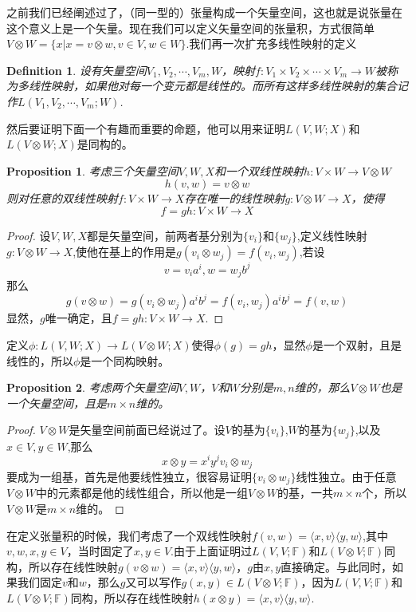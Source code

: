 \documentclass[11pt,a4paper,openany]{book}%
\theoremstyle{plain}%
\newtheorem{pro}{Proposition}[chapter]%
\newtheorem{defi}{Definition}[chapter]%
\begin{document}
之前我们已经阐述过了，（同一型的）张量构成一个矢量空间，这也就是说张量在这个意义上是一个矢量。现在我们可以定义矢量空间的张量积，方式很简单
$V\otimes W=\{x|x=v\otimes w,v\in V,w \in W\}$.我们再一次扩充多线性映射的定义
\begin{defi}
设有矢量空间$V_1,V_2,\cdots,V_m,W$，映射$f:V_1\times V_2\times \cdots \times V_m\rightarrow W$被称为多线性映射，如果他对每一个变元都是线性的。而所有这样多线性映射的集合记作$L(V_1,V_2,\cdots,V_m;W)$.
\end{defi}
然后要证明下面一个有趣而重要的命题，他可以用来证明$L(V,W;X)$和$L(V\otimes W;X)$是同构的。
\begin{pro}
考虑三个矢量空间$V,W,X$和一个双线性映射$h:V\times W\rightarrow V\otimes W$
\[
h(v,w)=v\otimes w
\]
则对任意的双线性映射$f:V\times W\rightarrow X$存在唯一的线性映射$g:V\otimes W\rightarrow X$，使得
\[
f=gh:V\times W\rightarrow X
\]
\end{pro}
\begin{proof}
设$V,W,X$都是矢量空间，前两者基分别为$\{v_i\}$和$\{w_j\}$,定义线性映射$g:V\otimes W\rightarrow X$,使他在基上的作用是$g(v_i\otimes w_j)=f(v_i,w_j)$,若设
\[
v=v_ia^i,w=w_jb^j
\]
那么
\[
g(v\otimes w)=g(v_i\otimes w_j)a^ib^j=f(v_i,w_j)a^ib^j=f(v,w)
\]
显然，$g$唯一确定，且$f=gh:V\times W\rightarrow X$.
\end{proof}
定义$\phi:L(V,W;X)\rightarrow L(V\otimes W;X)$使得$\phi(g)=gh$，显然$\phi$是一个双射，且是线性的，所以$\phi$是一个同构映射。
\begin{pro}
考虑两个矢量空间$V,W$，$V$和$W$分别是$m,n$维的，那么$V\otimes W$也是一个矢量空间，且是$m\times n$维的。
\end{pro}
\begin{proof}
$V\otimes W$是矢量空间前面已经说过了。设$V$的基为$\{v_i\}$,$W$的基为$\{w_j\}$,以及$x\in V,y\in W$,那么
\[
x\otimes y=x^iy^jv_i \otimes w_j
\]
要成为一组基，首先是他要线性独立，很容易证明$\{v_i \otimes w_j\}$线性独立。由于任意$V\otimes W$中的元素都是他的线性组合，所以他是一组$V\otimes W$的基，一共$m\times n$个，所以$V\otimes W$是$m\times n$维的。
\end{proof}

\indent 在定义张量积的时候，我们考虑了一个双线性映射$f(v,w)=\langle x,v \rangle \langle y,w \rangle$,其中$v,w,x,y\in V$，当时固定了$x,y\in V$.由于上面证明过$L(V,V;\mathbb{F})$和$L(V\otimes V;\mathbb{F})$同构，所以存在线性映射$g(v\otimes w)=\langle x,v \rangle \langle y,w \rangle$，$g$由$x,y$直接确定。与此同时，如果我们固定$v$和$w$，那么$g$又可以写作$g(x,y)\in L(V\otimes V;\mathbb{F})$，因为$L(V,V;\mathbb{F})$和$L(V\otimes V;\mathbb{F})$同构，所以存在线性映射$h(x\otimes y)=\langle x,v \rangle \langle y,w\rangle$.
\end{document}
